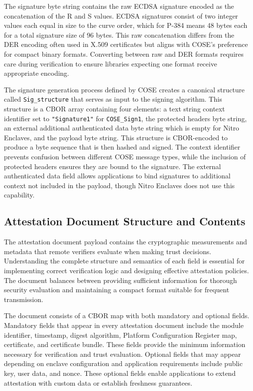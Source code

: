The signature byte string contains the raw ECDSA signature encoded as the concatenation of the R and S values. ECDSA signatures consist of two integer values each equal in size to the curve order, which for P-384 means 48 bytes each for a total signature size of 96 bytes. This raw concatenation differs from the DER encoding often used in X.509 certificates but aligns with COSE's preference for compact binary formats. Converting between raw and DER formats requires care during verification to ensure libraries expecting one format receive appropriate encoding.

The signature generation process defined by COSE creates a canonical structure called \texttt{Sig\_structure} that serves as input to the signing algorithm. This structure is a CBOR array containing four elements: a text string context identifier set to \texttt{"Signature1"} for \texttt{COSE\_Sign1}, the protected headers byte string, an external additional authenticated data byte string which is empty for Nitro Enclaves, and the payload byte string. This structure is CBOR-encoded to produce a byte sequence that is then hashed and signed. The context identifier prevents confusion between different COSE message types, while the inclusion of protected headers ensures they are bound to the signature. The external authenticated data field allows applications to bind signatures to additional context not included in the payload, though Nitro Enclaves does not use this capability.


\subsection{Attestation Document Structure and Contents}

The attestation document payload contains the cryptographic measurements and metadata that remote verifiers evaluate when making trust decisions. Understanding the complete structure and semantics of each field is essential for implementing correct verification logic and designing effective attestation policies. The document balances between providing sufficient information for thorough security evaluation and maintaining a compact format suitable for frequent transmission.

The document consists of a CBOR map with both mandatory and optional fields. Mandatory fields that appear in every attestation document include the module identifier, timestamp, digest algorithm, Platform Configuration Register map, certificate, and certificate bundle. These fields provide the minimum information necessary for verification and trust evaluation. Optional fields that may appear depending on enclave configuration and application requirements include public key, user data, and nonce. These optional fields enable applications to extend attestation with custom data or establish freshness guarantees.

